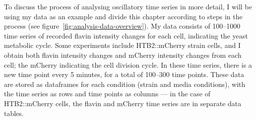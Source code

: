 To discuss the process of analysing oscillatory time series in more detail, I will be using my data as an example and divide this chapter according to steps in the process (see figure~\ref{fig:analysis-data-overview}).
My data consists of 100--1000 time series of recorded flavin intensity changes for each cell, indicating the yeast metabolic cycle.
Some experiments include HTB2::mCherry strain cells, and I obtain both flavin intensity changes and mCherry intensity changes from each cell;
the mCherry indicating the cell division cycle.
In these time series, there is a new time point every 5 minutes, for a total of 100--300 time points.
These data are stored as dataframes for each condition (strain and media conditions), with the time series as rows and time points as columns ---
in the case of HTB2::mCherry cells, the flavin and mCherry time series are in separate data tables.
